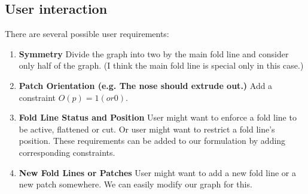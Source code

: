 \documentclass{article}
\begin{document}
\subsection{User interaction}
There are several possible user requirements:
\begin{enumerate}
\item \textbf{Symmetry} Divide the graph into two by the main fold line and consider only half of the graph. (I think the main fold line is special only in this case.)
\item \textbf{Patch Orientation (e.g. The nose should extrude out.)} Add a constraint $O(p) = 1 (or 0)$.
\item \textbf{Fold Line Status and Position} User might want to enforce a fold line to be active, flattened or cut. Or user might want to restrict a fold line's position. These requirements can be added to our formulation by adding corresponding constraints.
\item \textbf{New Fold Lines or Patches} User might want to add a new fold line or a new patch somewhere. We can easily modify our graph for this.
\end{enumerate}
\end{document}
